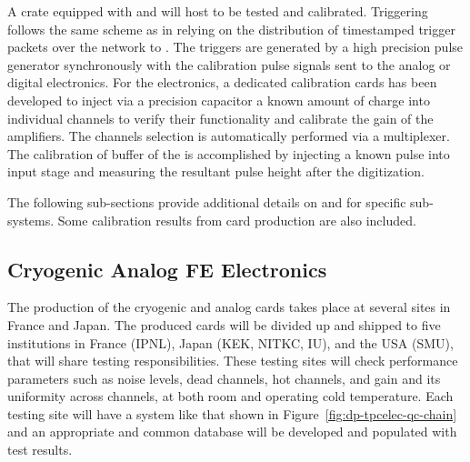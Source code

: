 A  crate equipped with  and  will host  to be tested and calibrated. Triggering follows the same scheme as in  relying on the distribution of timestamped trigger packets over the  network to . The triggers are generated by a high precision pulse generator synchronously with the calibration pulse signals sent to the analog or digital electronics. For  the electronics, a dedicated calibration cards has been developed to inject via a precision capacitor a known amount of charge into individual  channels to verify their functionality and calibrate the gain of the amplifiers. The channels selection is automatically performed via a multiplexer. The calibration of  buffer of the   is accomplished by injecting a known pulse into input stage and measuring the resultant pulse height after the digitization. 

The following sub-sections provide additional details on  and  for specific sub-systems. Some calibration results from  card production are also included.


\subsection{Cryogenic Analog FE Electronics}
\label{ssec:dp-tpcelec-prod-cryofe}

The production of the cryogenic  and analog  cards takes place at several sites in France and Japan. The produced cards will be divided up and shipped to five institutions in France (IPNL), Japan (KEK, NITKC, IU), and the USA (SMU), that will share testing responsibilities. These testing sites will check performance parameters such as noise levels, dead channels, hot channels, and gain and its uniformity across channels, at both room and operating cold temperature. Each testing site will have a system like that shown in Figure~\ref{fig:dp-tpcelec-qc-chain} and an appropriate and common database will be developed and populated with test results. 

